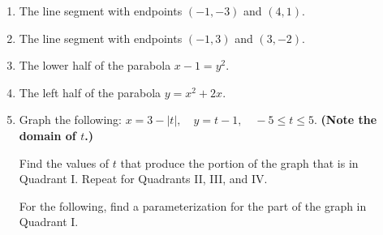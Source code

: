 \documentclass[11pt]{article}
\begin{document}
\begin{enumerate}

    \vspace{2ex}

    \noindent Find a parameterization of the curve.

    \item The line segment with endpoints $\displaystyle (-1, -3)$ and $\displaystyle (4, 1)$.

    \vspace{6ex}

    \item The line segment with endpoints $\displaystyle (-1, 3)$ and $\displaystyle (3, -2)$.

    \vspace{6ex}

    \item The lower half of the parabola $\displaystyle x - 1 = y^2$.

    \vspace{6ex}

    \item The left half of the parabola $\displaystyle y = x^2 + 2x$.

    \vspace{6ex}

    \item Graph the following: $\displaystyle x = 3 - |t|,\quad y = t - 1,\quad -5 \le t \le 5$. \textbf{(Note the domain of $t$.)}

    \emptygraph

    \noindent Find the values of $t$ that produce the portion of the graph that is in Quadrant I. Repeat for Quadrants II, III, and IV.

    \vspace{26ex}

    \newpage

    \noindent For the following, find a parameterization for the part of the graph in Quadrant I.



\end{enumerate}
\end{document}
